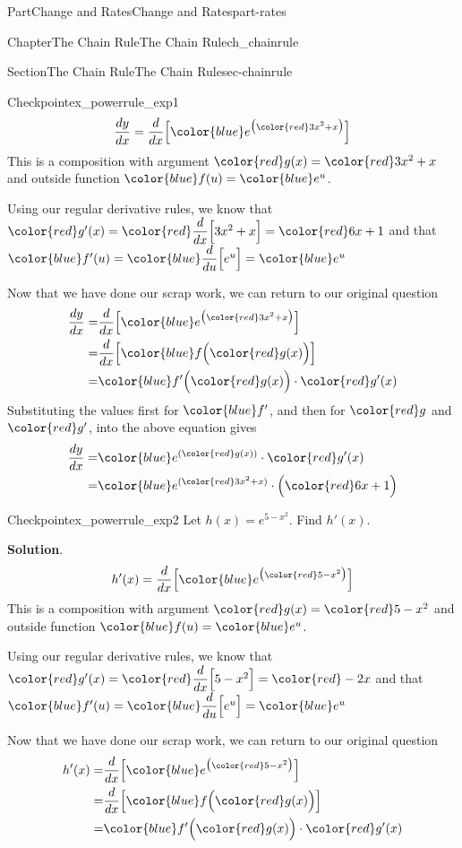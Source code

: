 \documentclass[oneside,10pt,]{tufte-book}
\newcommand{\blocktitlefont}{\relax}
\numberwithin{equation}{chapter}
\newcommand{\red}[1]{   {\color{red}   #1}   }
\newcommand{\blue}[1]{  {\color{blue}  #1}  }
\newcommand{\ddx}[1]{ \dfrac{d}{dx} \Big[ #1 \Big]  }
\newcommand{\ddu}[1]{ \dfrac{d}{du} \Big[ #1 \Big]  }
\newcommand{\amp}{&}
\begin{document}
\begin{partptx}{Part}{Change and Rates}{}{Change and Rates}{}{}{part-rates}
\begin{chapterptx}{Chapter}{The Chain Rule}{}{The Chain Rule}{}{}{ch_chainrule}
\begin{sectionptx}{Section}{The Chain Rule}{}{The Chain Rule}{}{}{sec-chainrule}
\begin{inlineexercise}{Checkpoint}{}{ex_powerrule_exp1}
\begin{equation*}
\frac{dy}{dx} = \ddx{\blue{ e^{\big(\red{3x^2+x}\big)} } } 
\end{equation*}
This is a composition with argument \(\red{g(x)} = \red{3x^2+x}\) and outside function \(\blue{f(u)} = \blue{ e^u }\).%
\par
Using our regular derivative rules, we know that \(\red{g'(x)} = \red{ \ddx{3x^2 +x} } = \red{6x+1} \) and that \(\blue{f'(u)} = \blue{\ddu{ e^u }} = \blue{e^u} \)%
\par
Now that we have done our scrap work, we can return to our original question%
\begin{align*}
\frac{dy}{dx} = \amp \ddx{\blue{ e^{\big(\red{3x^2+x}\big)} } }  \\
= \amp \ddx{ \blue{f\Big( \red{g(x)} \Big) } }\\
= \amp \blue{f'\Big( \red{g(x)}\Big)}\cdot \red{g'(x)}
\end{align*}
Substituting the values first for \(\blue{f'}\), and then for  \(\red{g}\) and \(\red{g'}\), into the above equation gives%
\begin{align*}
\frac{dy}{dx} = \amp \blue{ e^{(\red{g(x)})} }\cdot \red{g'(x)}\\
= \amp \blue{ e^{(\red{3x^2+x})} }\cdot \Big(\red{6x+1}\Big)
\end{align*}
%
\end{inlineexercise}%
\begin{inlineexercise}{Checkpoint}{}{ex_powerrule_exp2}%
Let \(h(x) = e^{5-x^2}\).  Find \(h'(x)\).%
\par\smallskip%
\noindent\textbf{\blocktitlefont Solution}.\hypertarget{ex_powerrule_exp2-2}{}\quad{}%
\begin{equation*}
h'(x) = \ddx{ \blue{ e^{\big( \red{5-x^2} \big)} } }
\end{equation*}
This is a composition with argument \(\red{g(x)} = \red{5-x^2}\) and outside function \(\blue{f(u)} = \blue{ e^u }\).%
\par
Using our regular derivative rules, we know that \(\red{g'(x)} 
= \red{ \ddx{5-x^2} } = \red{-2x} \) and that \(\blue{f'(u)} 
= \blue{\ddu{ e^u }} = \blue{e^u} \)%
\par
Now that we have done our scrap work, we can return to our original question%
\begin{align*}
h'(x) = \amp 
\ddx{\blue{ e^{\big(\red{5-x^2}\big)} } }  \\
= \amp \ddx{ \blue{f\Big( \red{g(x)} \Big) } }\\
= \amp \blue{f'\Big( \red{g(x)}\Big)}\cdot \red{g'(x)}

\end{align*}
\end{inlineexercise}
\end{sectionptx}
\end{chapterptx}
\end{partptx}
\end{document}
